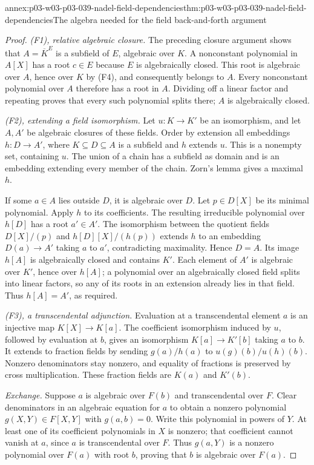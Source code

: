 \begin{annexitem}{annex:p03-w03-p03-039-nadel-field-dependencies}{thm:p03-w03-p03-039-nadel-field-dependencies}{The algebra needed for the field back-and-forth argument}
\begin{proof}
\emph{(F1), relative algebraic closure.} The preceding closure argument
shows that \(A=\overline K^E\) is a subfield of \(E\), algebraic over
\(K\). A nonconstant polynomial in \(A[X]\) has a root \(c\in E\)
because \(E\) is algebraically closed. This root is algebraic over
\(A\), hence over \(K\) by (F4), and consequently belongs to \(A\).
Every nonconstant polynomial over \(A\) therefore has a root in \(A\).
Dividing off a linear factor and repeating proves that every such
polynomial splits there; \(A\) is algebraically closed.

\emph{(F2), extending a field isomorphism.} Let \(u:K\to K'\) be
an isomorphism, and let \(A,A'\) be algebraic closures of these fields.
Order by extension all embeddings \(h:D\to A'\), where
\(K\subseteq D\subseteq A\) is a subfield and \(h\) extends \(u\).
This is a nonempty set, containing \(u\). The union of a chain has a
subfield as domain and is an embedding extending every member of the
chain. Zorn's lemma gives a maximal \(h\).

If some \(a\in A\) lies outside \(D\), it is algebraic over \(D\).
Let \(p\in D[X]\) be its minimal polynomial. Apply \(h\) to its
coefficients. The resulting irreducible polynomial over \(h[D]\) has
a root \(a'\in A'\). The isomorphism between the quotient fields
\(D[X]/(p)\) and \(h[D][X]/(h(p))\) extends \(h\) to an embedding
\(D(a)\to A'\) taking \(a\) to \(a'\), contradicting maximality.
Hence \(D=A\). Its image \(h[A]\) is algebraically closed and contains
\(K'\). Each element of \(A'\) is algebraic over \(K'\), hence over
\(h[A]\); a polynomial over an algebraically closed field splits into
linear factors, so any of its roots in an extension already lies in
that field. Thus \(h[A]=A'\), as required.

\emph{(F3), a transcendental adjunction.} Evaluation at a transcendental
element \(a\) is an injective map \(K[X]\to K[a]\). The coefficient
isomorphism induced by \(u\), followed by evaluation at \(b\), gives
an isomorphism \(K[a]\to K'[b]\) taking \(a\) to \(b\). It extends
to fraction fields by sending \(g(a)/h(a)\) to
\(u(g)(b)/u(h)(b)\). Nonzero denominators stay nonzero, and equality
of fractions is preserved by cross multiplication. These fraction
fields are \(K(a)\) and \(K'(b)\).

\emph{Exchange.} Suppose \(a\) is algebraic over \(F(b)\) and
transcendental over \(F\). Clear denominators in an algebraic equation
for \(a\) to obtain a nonzero polynomial \(g(X,Y)\in F[X,Y]\) with
\(g(a,b)=0\). Write this polynomial in powers of \(Y\). At least one
of its coefficient polynomials in \(X\) is nonzero; that coefficient
cannot vanish at \(a\), since \(a\) is transcendental over \(F\).
Thus \(g(a,Y)\) is a nonzero polynomial over \(F(a)\) with root
\(b\), proving that \(b\) is algebraic over \(F(a)\).


\end{proof}
\end{annexitem}
